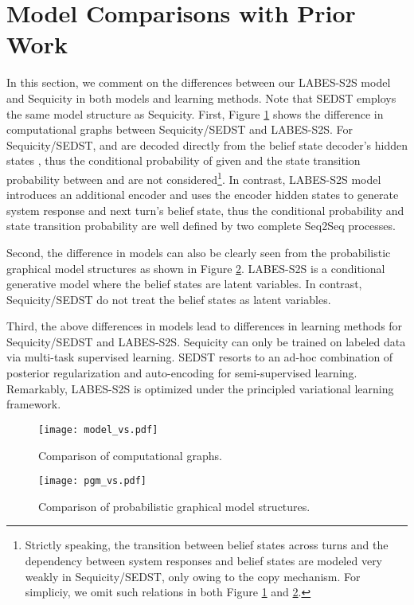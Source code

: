 \documentclass[11pt,a4paper]{article}
\newcommand{\modelname}{LABES}
\begin{document}
	\section{Model Comparisons with Prior Work}
	\label{app:vs}
	In this section, we comment on the differences between our \modelname{}-S2S model and Sequicity \cite{lei2018sequicity} in both models and learning methods. Note that SEDST \cite{sedst} employs the same model structure as Sequicity. 
	First, Figure \ref{model_vs} shows the difference in computational graphs between Sequicity/SEDST and \modelname{}-S2S.
	For Sequicity/SEDST,  and  are decoded directly from the belief state decoder's hidden states , thus the conditional probability of  given  and the state transition probability between  and  are not considered\footnote{Strictly speaking, the transition between belief states across turns and the dependency between system responses and belief states are modeled very weakly in Sequicity/SEDST, only owing to the copy mechanism. For simpliciy, we omit such relations in both Figure \ref{model_vs} and \ref{pgm_vs}.}. 
	In contrast, \modelname{}-S2S model introduces an additional  encoder and uses the encoder hidden states  to generate system response and next turn's belief state, thus the conditional probability  and state transition probability  are well defined by two complete Seq2Seq processes. 
	
	Second, the difference in models can also be clearly seen from the probabilistic graphical model structures as shown in Figure \ref{pgm_vs}. 
	\modelname{}-S2S is a conditional generative model where the belief states are latent variables. In contrast, Sequicity/SEDST do not treat the belief states as latent variables. 
	
	Third, the above differences in models lead to differences in learning methods for Sequicity/SEDST and \modelname{}-S2S.
	Sequicity can only be trained on labeled data via multi-task supervised learning.
	SEDST resorts to an ad-hoc combination of posterior regularization and auto-encoding for semi-supervised learning.
	Remarkably, \modelname{}-S2S is optimized under the principled variational learning framework.
	
	\begin{figure}[t]
		\centering
		\texttt{[image: model\_vs.pdf]}
		\caption{Comparison of computational graphs.  }
		\label{model_vs}
\end{figure}
	
	\begin{figure}[t]
		\centering
		\texttt{[image: pgm\_vs.pdf]}
		\caption{Comparison of probabilistic graphical model structures. }
		\label{pgm_vs}
	\end{figure}
	
\end{document}
